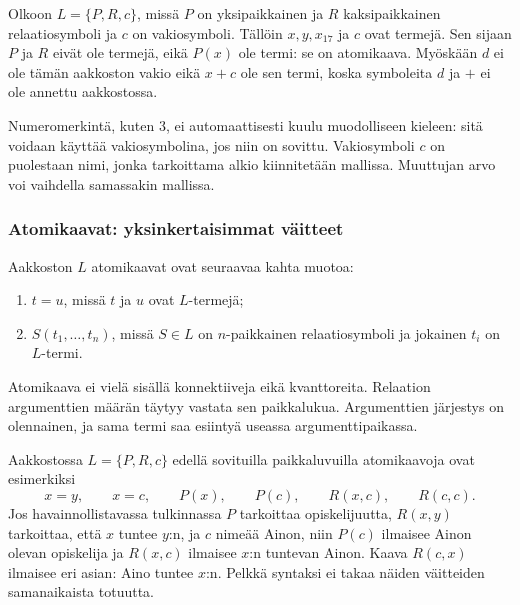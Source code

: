 \documentclass[11pt,a4paper]{amsart}
\begin{document}
\begin{example}
  Olkoon $L=\{P,R,c\}$, missä $P$ on yksipaikkainen ja $R$
  kaksipaikkainen relaatiosymboli ja $c$ on vakiosymboli.
  Tällöin $x,y,x_{17}$ ja $c$ ovat termejä. Sen sijaan $P$ ja $R$
  eivät ole termejä, eikä $P(x)$ ole termi: se on atomikaava.
  Myöskään $d$ ei ole tämän aakkoston vakio eikä $x+c$ ole sen termi,
  koska symboleita $d$ ja $+$ ei ole annettu aakkostossa.
\end{example}

Numeromerkintä, kuten $3$, ei automaattisesti kuulu muodolliseen kieleen:
sitä voidaan käyttää vakiosymbolina, jos niin on sovittu. Vakiosymboli
$c$ on puolestaan nimi, jonka tarkoittama alkio kiinnitetään mallissa.
Muuttujan arvo voi vaihdella samassakin mallissa.

\subsubsection{Atomikaavat: yksinkertaisimmat väitteet}

\begin{definition}[Atomikaavat]
  Aakkoston $L$ atomikaavat ovat seuraavaa kahta muotoa:
  \begin{enumerate}
    \item $t=u$, missä $t$ ja $u$ ovat $L$-termejä;
    \item $S(t_1,\ldots,t_n)$, missä $S\in L$ on $n$-paikkainen
      relaatiosymboli ja jokainen $t_i$ on $L$-termi.
  \end{enumerate}
\end{definition}

Atomikaava ei vielä sisällä konnektiiveja eikä kvanttoreita.
Relaation argumenttien määrän täytyy vastata sen paikkalukua.
Argumenttien järjestys on olennainen, ja sama termi saa esiintyä
useassa argumenttipaikassa.

\begin{example}
  Aakkostossa $L=\{P,R,c\}$ edellä sovituilla paikkaluvuilla
  atomikaavoja ovat esimerkiksi
  \[
    x=y,\qquad x=c,\qquad P(x),\qquad P(c),\qquad
    R(x,c),\qquad R(c,c).
  \]
  Jos havainnollistavassa tulkinnassa $P$ tarkoittaa opiskelijuutta,
  $R(x,y)$ tarkoittaa, että $x$ tuntee $y$:n, ja $c$ nimeää Ainon,
  niin $P(c)$ ilmaisee Ainon olevan opiskelija ja $R(x,c)$ ilmaisee
  $x$:n tuntevan Ainon. Kaava $R(c,x)$ ilmaisee eri asian:
  Aino tuntee $x$:n. Pelkkä syntaksi ei takaa näiden väitteiden
  samanaikaista totuutta.
\end{example}
\end{document}
